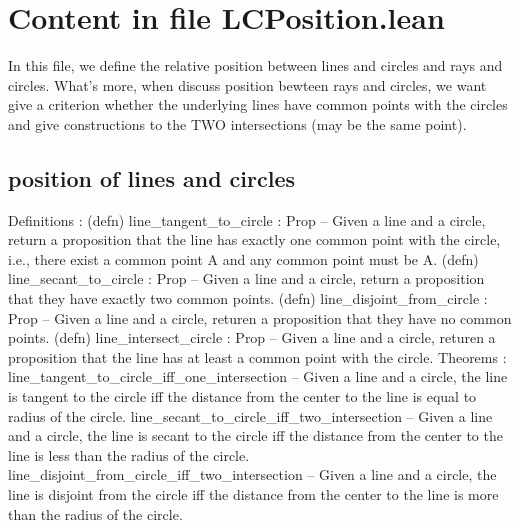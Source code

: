 \documentclass[12pt,a4paper]{article}
\begin{document}
\section{Content in file LCPosition.lean}
In this file, we define the relative position between lines and circles and rays and circles. What's more, when discuss position bewteen rays and circles, we want give a criterion whether the underlying lines have common points with the circles and give constructions to the TWO intersections (may be the same point).
  \subsection{position of lines and circles}
    Definitions : 
     (defn) line_tangent_to_circle : Prop -- Given a line and a circle, return a proposition that the line has exactly one common point with the circle, i.e., there exist a common point A and any common point must be A.
     (defn) line_secant_to_circle : Prop -- Given a line and a circle, return a proposition that they have exactly two common points.
     (defn) line_disjoint_from_circle : Prop -- Given a line and a circle, returen a proposition that they have no common points.
     (defn) line_intersect_circle : Prop -- Given a line and a circle, returen a proposition that the line has at least a common point with the circle.
    Theorems : 
      line_tangent_to_circle_iff_one_intersection -- Given a line and a circle, the line is tangent to the circle iff the distance from the center to the line is equal to radius of the circle. 
      line_secant_to_circle_iff_two_intersection -- Given a line and a circle, the line is secant to the circle iff the distance from the center to the line is less than the radius of the circle.
      line_disjoint_from_circle_iff_two_intersection -- Given a line and a circle, the line is disjoint from the circle iff the distance from the center to the line is more than the radius of the circle.
      
\end{document}
